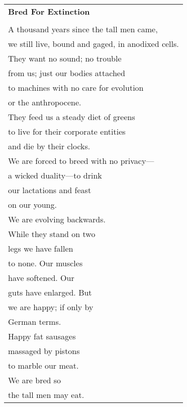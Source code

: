 \documentclass{article}
\begin{document}
\begin{center}
\begin{tabular}{l}
\textbf{Bred For Extinction} \\
\\
A thousand years since the tall men came, \\
we still live, bound and gaged, in anodixed cells. \\
They want no sound; no trouble \\
from us; just our bodies attached \\
to machines with no care for evolution \\
or the anthropocene. \\ %
They feed us a steady diet of greens \\
to live for their corporate entities \\
and die by their clocks. \\
We are forced to breed with no privacy--- \\
a wicked duality---to drink \\
our lactations and feast \\
on our young. \\
We are evolving backwards. \\
While they stand on two \\
legs we have fallen \\
to none.  Our muscles \\
have softened.  Our \\
guts have enlarged. But \\
we are happy; if only by \\
German terms. \\
Happy fat sausages \\
massaged by pistons \\
to marble our meat. \\
We are bred so \\
the tall men may eat. \\
\end{tabular}
\end{center}
\end{document}
